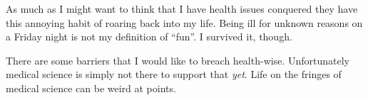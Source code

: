 As much as I might want to think that I have health issues conquered
they have this annoying habit of roaring back into my life. Being ill
for unknown reasons on a Friday night is not my definition of ``fun''. I
survived it, though.

There are some barriers that I would like to breach health-wise.
Unfortunately medical science is simply not there to support that
\emph{yet}. Life on the fringes of medical science can be weird at
points.
